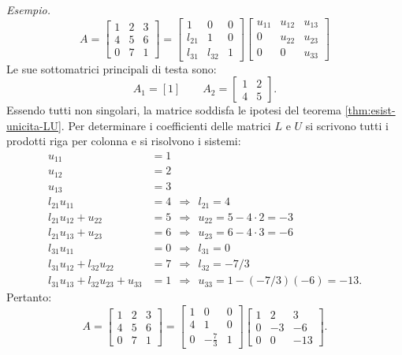 \textit{Esempio.}
\begin{equation*}
A=\begin{bmatrix}
1 & 2 & 3\\
4 & 5 & 6\\
0 & 7 & 1
\end{bmatrix} =\begin{bmatrix}
1 & 0 & 0\\
l_{21} & 1 & 0\\
l_{31} & l_{32} & 1
\end{bmatrix}\begin{bmatrix}
u_{11} & u_{12} & u_{13}\\
0 & u_{22} & u_{23}\\
0 & 0 & u_{33}
\end{bmatrix}
\end{equation*}
Le sue sottomatrici principali di testa sono:
\begin{equation*}
A_{1} =[ 1] \qquad A_{2} =\begin{bmatrix}
1 & 2\\
4 & 5
\end{bmatrix}.
\end{equation*}
Essendo tutti non singolari, la matrice soddisfa le ipotesi del teorema \ref{thm:esist-unicita-LU}.
Per determinare i coefficienti delle matrici $L$ e $U$ si scrivono tutti i prodotti riga per colonna e si risolvono i sistemi:
\begin{align*}
u_{11} & =1\\
u_{12} & =2\\
u_{13} & =3\\
l_{21} u_{11} & =4\ \ \Rightarrow \ \ l_{21} =4\\
l_{21} u_{12} +u_{22} & =5\ \ \Rightarrow \ \ u_{22} =5-4\cdot 2=-3\\
l_{21} u_{13} +u_{23} & =6\ \ \Rightarrow \ \ u_{23} =6-4\cdot 3=-6\\
l_{31} u_{11} & =0\ \ \Rightarrow \ \ l_{31} =0\\
l_{31} u_{12} +l_{32} u_{22} & =7\ \ \Rightarrow \ \ l_{32} =-7/3\\
l_{31} u_{13} +l_{32} u_{23} +u_{33} & =1\ \ \Rightarrow \ \ u_{33} =1-( -7/3)( -6) =-13.
\end{align*}
Pertanto:
\begin{equation*}
A=\begin{bmatrix}
1 & 2 & 3\\
4 & 5 & 6\\
0 & 7 & 1
\end{bmatrix} =\begin{bmatrix}
1 & 0 & 0\\
4 & 1 & 0\\
0 & -\frac{7}{3} & 1
\end{bmatrix}\begin{bmatrix}
1 & 2 & 3\\
0 & -3 & -6\\
0 & 0 & -13
\end{bmatrix}.
\end{equation*}


